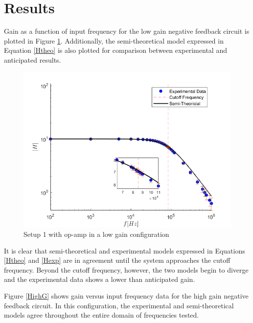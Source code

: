 \documentclass[letterpaper,12pt]{article}
\begin{document}
\section{Results}
Gain as a function of input frequency for the low gain negative feedback circuit is plotted in Figure \ref{LowG}. Additionally, the semi-theoretical model expressed in Equation \ref{Htheo} is also plotted for comparison between experimental and anticipated results.  

\begin{figure}[ht]
    \centering
    \includegraphics[scale = .6]{LowGain.png}
    \caption{Setup 1 with op-amp in a low gain configuration}
    \label{LowG}
\end{figure}
It is clear that semi-theoretical and experimental models expressed in Equations \ref{Htheo} and \ref{Hexp} are in agreement until the system approaches the cutoff frequency. Beyond the cutoff frequency, however, the two models begin to diverge and the experimental data shows a lower than anticipated gain.

Figure \ref{HighG} shows gain versus input frequency data for the high gain negative feedback circuit. In this configuration, the experimental and semi-theoretical models agree throughout the entire domain of frequencies tested.
\end{document}
